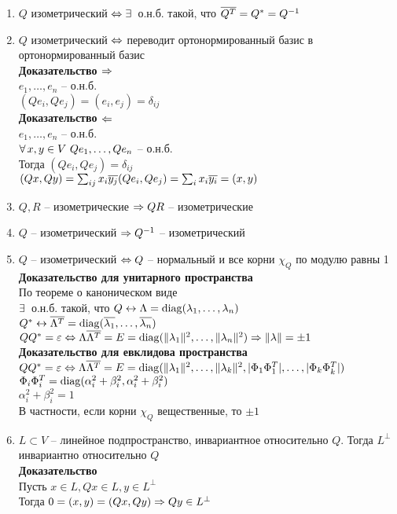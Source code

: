 \documentclass[12pt]{article}
\begin{document}
\begin{enumerate}
    \item $Q$ изометрический $\Leftrightarrow \exists\,$ о.н.б. такой, что $\overline{Q^T} = Q^* = Q^{-1}$ 
    \item $Q$ изометрический $\Leftrightarrow$ переводит ортонормированный базис в ортонормированный базис\\
    \textbf{Доказательство $\Rightarrow$}\\
    $e_1, \ldots, e_n$ -- о.н.б.\\
    $(Qe_i, Qe_j) = (e_i, e_j) = \delta_{ij}$\\
    \textbf{Доказательство $\Leftarrow$}\\
    $e_1, \ldots, e_n$ -- о.н.б.\\
    $\forall\, x, y \in V\ Qe_1, \ldots, Qe_n$ -- о.н.б.\\
    Тогда $(Qe_i, Qe_j) = \delta_{ij}$\\
    $(Qx, Qy) = \sum_{ij} x_i \overline{y_j}(Qe_i, Qe_j) = \sum_i x_i \overline{y_i} = (x,y)$
    \item $Q, R$ -- изометрические $\Rightarrow QR$ -- изометрические
    \item $Q$ -- изометрический $\Rightarrow Q^{-1}$ -- изометрический
    \item $Q$ -- изометрический $\Leftrightarrow Q$ -- нормальный и все корни $\chi_Q$ по модулю равны 1\\ 
    \textbf{Доказательство для унитарного пространства}\\
    По теореме о каноническом виде\\
    $\exists\,$ о.н.б. такой, что $Q \leftrightarrow \Lambda = \operatorname{diag}( \lambda_1, \ldots, \lambda_n)$\\
    $Q^* \leftrightarrow \overline{ \Lambda^T} = \operatorname{diag}( \overline{\lambda_1}, \ldots, \overline{ \lambda_n})$\\
    $QQ^* = \varepsilon \Leftrightarrow \Lambda \overline{ \Lambda^T} = E = \operatorname{diag}(\| \lambda_1\|^2, \ldots, \| \lambda_n\|^2) \Rightarrow \|\lambda\| = \pm 1$\\
    \textbf{Доказательство для евклидова пространства}\\
    $QQ^* = \varepsilon \Leftrightarrow \Lambda \overline{ \Lambda^T} = E = \operatorname{diag}(\| \lambda_1\|^2, \ldots, \| \lambda_k\|^2, |\Phi_1\Phi_1^T|, \ldots, |\Phi_k\Phi_k^T|)$\\
    $ \Phi_i \Phi_i^T = \operatorname{diag}( \alpha_i^2 + \beta_i^2, \alpha_i^2 + \beta_i^2)$\\
    $ \alpha_i^2 + \beta_i^2 = 1$\\
    В частности, если корни $\chi_Q$ вещественные, то $\pm 1$
    \item $L \subset V$ -- линейное подпространство, инвариантное относительно $Q$. Тогда $L^\perp$ инвариантно относительно $Q$\\
    \textbf{Доказательство}\\
    Пусть $x \in L, Qx \in L, y \in L^\perp$\\
    Тогда $0 = (x, y) = (Qx, Qy) \Rightarrow Qy \in L^\perp$
\end{enumerate}
\end{document}
